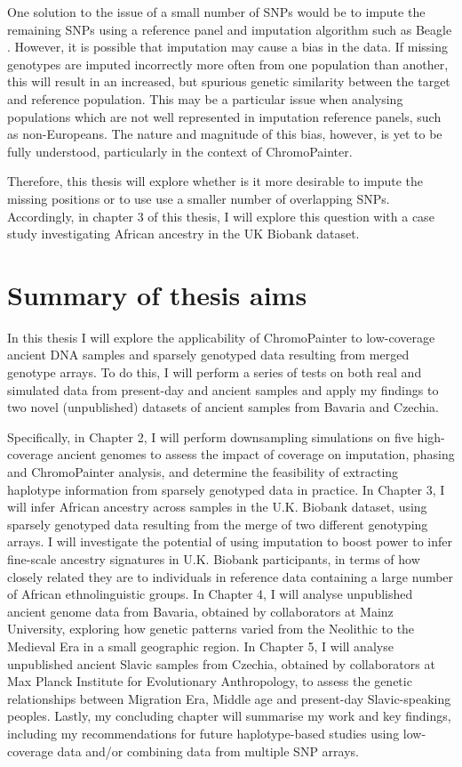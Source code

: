 One solution to the issue of a small number of SNPs would be to impute the remaining SNPs using a reference panel and imputation algorithm such as Beagle \cite{Browning2016}. However, it is possible that imputation may cause a bias in the data. If missing genotypes are imputed incorrectly more often from one population than another, this will result in an increased, but spurious genetic similarity between the target and reference population. This may be a particular issue when analysing populations which are not well represented in imputation reference panels, such as non-Europeans. The nature and magnitude of this bias, however, is yet to be fully understood, particularly in the context of ChromoPainter.  

Therefore, this thesis will explore whether is it more desirable to impute the missing positions or to use use a smaller number of overlapping SNPs. Accordingly, in chapter 3 of this thesis, I will explore this question with a case study investigating African ancestry in the UK Biobank dataset. 
 
\section{Summary of thesis aims}

In this thesis I will explore the applicability of ChromoPainter to low-coverage ancient DNA samples and sparsely genotyped data resulting from merged genotype arrays. To do this, I will perform a series of tests on both real and simulated data from present-day and ancient samples and apply my findings to two novel (unpublished) datasets of ancient samples from Bavaria and Czechia. 

Specifically, in Chapter 2, I will perform downsampling simulations on five high-coverage ancient genomes to assess the impact of coverage on imputation, phasing and ChromoPainter analysis, and determine the feasibility of extracting haplotype information from sparsely genotyped data in practice. In Chapter 3, I will infer African ancestry across samples in the U.K. Biobank dataset, using sparsely genotyped data resulting from the merge of two different genotyping arrays. I will investigate the potential of using imputation to boost power to infer fine-scale ancestry signatures in U.K. Biobank participants, in terms of how closely related they are to individuals in reference data containing a large number of African ethnolinguistic groups. In Chapter 4, I will analyse unpublished ancient genome data from Bavaria, obtained by collaborators at Mainz University, exploring how genetic patterns varied from the Neolithic to the Medieval Era in a small geographic region. In Chapter 5, I will analyse unpublished ancient Slavic samples from Czechia, obtained by collaborators at Max Planck Institute for Evolutionary Anthropology, to assess the genetic relationships between Migration Era, Middle age and present-day Slavic-speaking peoples. Lastly, my concluding chapter will summarise my work and key findings, including my recommendations for future haplotype-based studies using low-coverage data and/or combining data from multiple SNP arrays.




